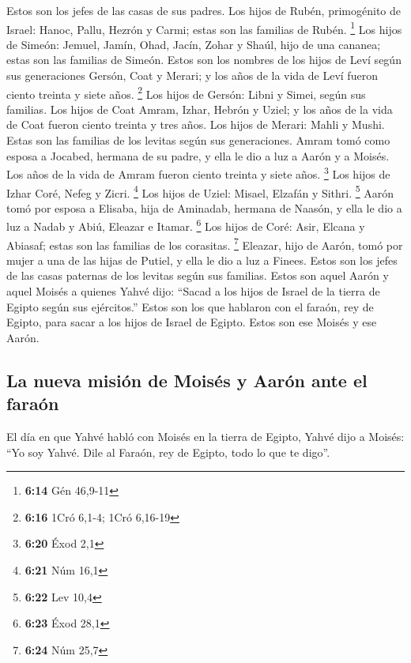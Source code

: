 \begin{paracol}{2}
 Estos son los jefes de las casas de sus padres. Los
hijos de Rubén, primogénito de Israel: Hanoc, Pallu, Hezrón y Carmi;
estas son las familias de Rubén. \footnote{\textbf{6:14} Gén 46,9-11}
 Los hijos de Simeón: Jemuel, Jamín, Ohad, Jacín, Zohar y
Shaúl, hijo de una cananea; estas son las familias de Simeón.
 Estos son los nombres de los hijos de Leví según sus
generaciones Gersón, Coat y Merari; y los años de la vida de Leví fueron
ciento treinta y siete años. \footnote{\textbf{6:16} 1Cró 6,1-4; 1Cró
  6,16-19}  Los hijos de Gersón: Libni y Simei, según sus
familias.  Los hijos de Coat Amram, Izhar, Hebrón y
Uziel; y los años de la vida de Coat fueron ciento treinta y tres años.
 Los hijos de Merari: Mahli y Mushi. Estas son las
familias de los levitas según sus generaciones.  Amram
tomó como esposa a Jocabed, hermana de su padre, y ella le dio a luz a
Aarón y a Moisés. Los años de la vida de Amram fueron ciento treinta y
siete años. \footnote{\textbf{6:20} Éxod 2,1}  Los hijos
de Izhar Coré, Nefeg y Zicri. \footnote{\textbf{6:21} Núm 16,1}
 Los hijos de Uziel: Misael, Elzafán y Sithri.
\footnote{\textbf{6:22} Lev 10,4}  Aarón tomó por esposa
a Elisaba, hija de Aminadab, hermana de Naasón, y ella le dio a luz a
Nadab y Abiú, Eleazar e Itamar. \footnote{\textbf{6:23} Éxod 28,1}
 Los hijos de Coré: Asir, Elcana y Abiasaf; estas son las
familias de los corasitas. \footnote{\textbf{6:24} Núm 25,7}
 Eleazar, hijo de Aarón, tomó por mujer a una de las
hijas de Putiel, y ella le dio a luz a Finees. Estos son los jefes de
las casas paternas de los levitas según sus familias. 
Estos son aquel Aarón y aquel Moisés a quienes Yahvé dijo: ``Sacad a los
hijos de Israel de la tierra de Egipto según sus ejércitos.''
 Estos son los que hablaron con el faraón, rey de Egipto,
para sacar a los hijos de Israel de Egipto. Estos son ese Moisés y ese
Aarón.

\hypertarget{la-nueva-misiuxf3n-de-moisuxe9s-y-aaruxf3n-ante-el-farauxf3n}{%
\subsection{La nueva misión de Moisés y Aarón ante el
faraón}\label{la-nueva-misiuxf3n-de-moisuxe9s-y-aaruxf3n-ante-el-farauxf3n}}

 El día en que Yahvé habló con Moisés en la tierra de
Egipto,  Yahvé dijo a Moisés: ``Yo soy Yahvé. Dile al
Faraón, rey de Egipto, todo lo que te digo''.


\end{paracol}
